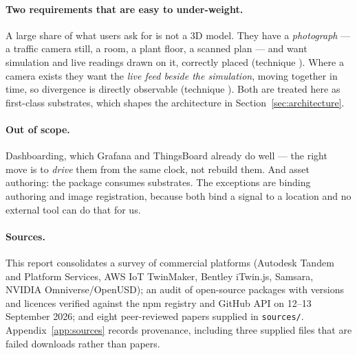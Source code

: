 \paragraph{Two requirements that are easy to under-weight.} A large share of what users
ask for is not a 3D model. They have a \emph{photograph} --- a traffic camera still, a
room, a plant floor, a scanned plan --- and want simulation and live readings drawn on
it, correctly placed (technique ). Where a camera exists they want the
\emph{live feed beside the simulation}, moving together in time, so divergence is
directly observable (technique ). Both are treated here as first-class
substrates, which shapes the architecture in Section~\ref{sec:architecture}.

\paragraph{Out of scope.} Dashboarding, which Grafana and ThingsBoard already do well ---
the right move is to \emph{drive} them from the same clock, not rebuild them. And asset
authoring: the package consumes substrates. The exceptions are binding authoring and
image registration, because both bind a signal to a location and no external tool can do
that for us.

\paragraph{Sources.} This report consolidates a survey of commercial platforms (Autodesk
Tandem and Platform Services, AWS IoT TwinMaker, Bentley iTwin.js, Samsara, NVIDIA
Omniverse/OpenUSD); an audit of open-source packages with versions and licences verified
against the npm registry and GitHub API on 12--13 September 2026; and eight peer-reviewed
papers supplied in \texttt{sources/}. Appendix~\ref{app:sources} records provenance,
including three supplied files that are failed downloads rather than papers.
